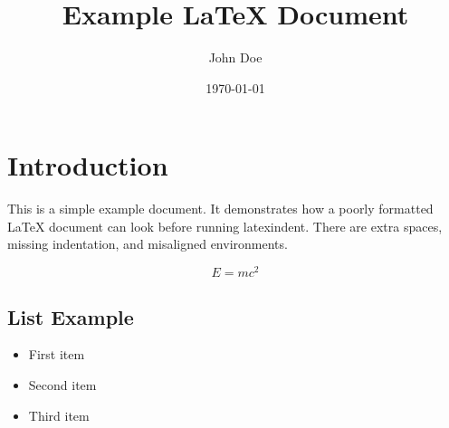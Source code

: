 \documentclass{article}
\begin{document}
\title{Example LaTeX Document}\author{John Doe}
\date{\today}
\maketitle

\section{Introduction}
This is a simple example document.     It demonstrates how a poorly formatted LaTeX document can look before running latexindent.   There are extra spaces, missing indentation, and misaligned environments.

\begin{equation}
    E = mc^2
\end{equation}

\subsection{List Example}
\begin{itemize}
    \item First item
    \item Second item
    \item Third item
\end{itemize}
\end{document}
